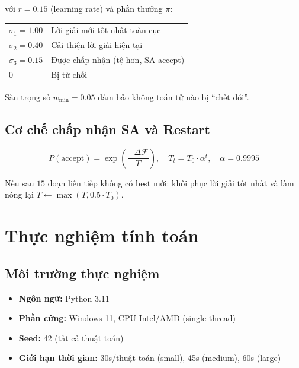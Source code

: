 \documentclass[12pt, a4paper]{article}
\newcommand{\fitfunc}{\mathcal{F}}
\begin{document}
với $r = 0.15$ (learning rate) và phần thưởng $\pi$:

\begin{center}
\begin{tabular}{ll}
  $\sigma_1 = 1.00$ & Lời giải mới tốt nhất toàn cục \\
  $\sigma_2 = 0.40$ & Cải thiện lời giải hiện tại \\
  $\sigma_3 = 0.15$ & Được chấp nhận (tệ hơn, SA accept) \\
  $0$               & Bị từ chối \\
\end{tabular}
\end{center}

Sàn trọng số $w_{\min} = 0.05$ đảm bảo không toán tử nào bị ``chết đói''.

\subsection{Cơ chế chấp nhận SA và Restart}

\begin{equation}
  P(\text{accept}) = \exp\!\left(\frac{-\Delta \fitfunc}{T}\right),
  \quad T_t = T_0 \cdot \alpha^t,\quad \alpha = 0.9995
\end{equation}

Nếu sau $15$ đoạn liên tiếp không có best mới: khôi phục lời giải tốt nhất và làm nóng lại $T \leftarrow \max(T, 0.5 \cdot T_0)$.

\section{Thực nghiệm tính toán}

\subsection{Môi trường thực nghiệm}

\begin{itemize}[noitemsep]
  \item \textbf{Ngôn ngữ:} Python 3.11
  \item \textbf{Phần cứng:} Windows 11, CPU Intel/AMD (single-thread)
  \item \textbf{Seed:} 42 (tất cả thuật toán)
  \item \textbf{Giới hạn thời gian:} 30s/thuật toán (small), 45s (medium), 60s (large)
\end{itemize}
\end{document}
